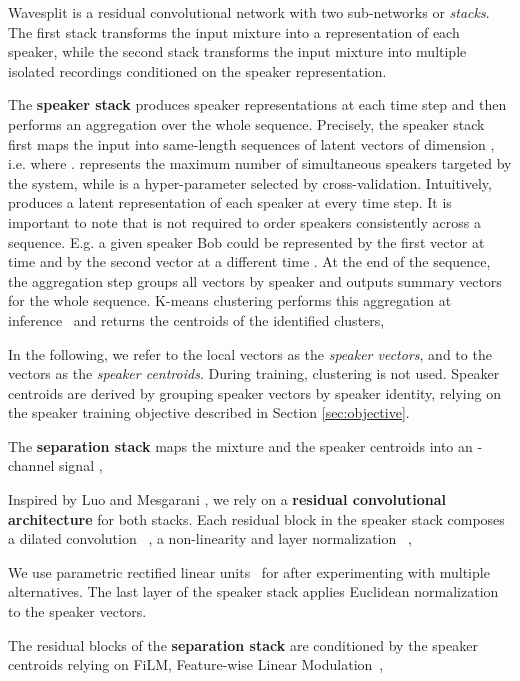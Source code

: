 \documentclass[letterpaper, onecolumn,10 pt]{IEEEtran}
\begin{document}
Wavesplit is a residual convolutional network with two sub-networks or {\it stacks}. The first stack transforms 
the input mixture into a representation of each speaker, while the second stack transforms the input mixture into multiple isolated recordings conditioned on the speaker representation.

The {\bf speaker stack} produces speaker representations at each time step and then performs an aggregation over the whole sequence. Precisely, the speaker stack first maps the input  into  same-length sequences of latent vectors of dimension , i.e.  where .
 represents the maximum number of simultaneous speakers targeted by the system, while 
 is a hyper-parameter selected by cross-validation. Intuitively,  produces a latent representation of each speaker at every time step. It is important to note that  is not required to order speakers consistently across a sequence. E.g. a  given speaker Bob could be represented by the first vector  at time  and by the second vector  at a different time .
At the end of the sequence, the aggregation step
groups all vectors by speaker and outputs  summary vectors for the whole sequence.
K-means clustering performs this aggregation at inference~\cite{lindebg80:kmeans} and returns the centroids 
of the  identified clusters,

In the following, we refer to the local vectors  as the {\it speaker vectors}, and to the vectors  as the {\it speaker centroids}. During training, clustering is not used. Speaker centroids are derived by grouping speaker vectors by speaker identity, relying on the speaker training objective described in Section \ref{sec:objective}.

The {\bf separation stack} maps the mixture  and the speaker centroids  into an -channel signal ,


Inspired by Luo and Mesgarani \cite{luo19:tasnet}, we rely on a {\bf residual convolutional architecture} for both stacks. Each residual block in
the speaker stack composes a dilated convolution ~\cite{yu16:dilated}, a non-linearity  and layer normalization ~\cite{ba2016:layernorm},

We use parametric rectified linear units~\cite{he15prelu} for  after experimenting with multiple alternatives.
The last layer of the speaker stack applies Euclidean normalization to the speaker vectors.

The residual blocks of the {\bf separation stack} are conditioned by the speaker centroids relying on FiLM, Feature-wise Linear Modulation~\cite{perez18film},
\end{document}
